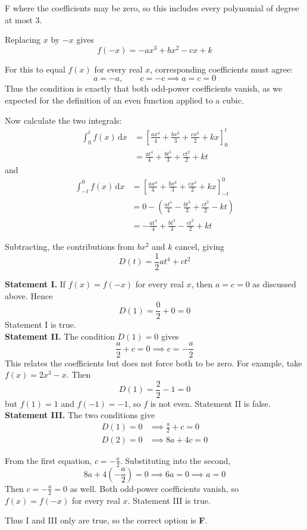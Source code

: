 \documentclass[11pt,a4paper]{article}
\begin{document}
\begin{enumerate}[label=\textbf{\arabic*.},leftmargin=*,itemsep=0pt,start=20]
\begin{djsSolution}{F}
where the coefficients may be zero, so this includes every polynomial of degree at most $3$.

Replacing $x$ by $-x$ gives
\[
f(-x)=-ax^3+bx^2-cx+k
\]

For this to equal $f(x)$ for every real $x$, corresponding coefficients must agree:
\[
a=-a,\qquad c=-c
\implies a=c=0
\]
Thus the condition is exactly that both odd-power coefficients vanish, as we expected for the definition of an even function applied to a cubic.

Now calculate the two integrals:
\[
\begin{aligned}
\int_0^t f(x)\,\mathrm{d}x
&=\left[\frac{ax^4}{4}+\frac{bx^3}{3}+\frac{cx^2}{2}+kx\right]_0^t\\[8pt]
&=\frac{at^4}{4}+\frac{bt^3}{3}+\frac{ct^2}{2}+kt
\end{aligned}
\]
and
\[
\begin{aligned}
\int_{-t}^0 f(x)\,\mathrm{d}x
&=\left[\frac{ax^4}{4}+\frac{bx^3}{3}+\frac{cx^2}{2}+kx\right]_{-t}^0\\[8pt]
&=0-\left(\frac{at^4}{4}-\frac{bt^3}{3}+\frac{ct^2}{2}-kt\right)\\[8pt]
&=-\frac{at^4}{4}+\frac{bt^3}{3}-\frac{ct^2}{2}+kt
\end{aligned}
\]

Subtracting, the contributions from $bx^2$ and $k$ cancel, giving
\[
\boxed{D(t)=\frac{1}{2}at^4+ct^2}
\]

\textbf{Statement I.} If $f(x)=f(-x)$ for every real $x$, then $a=c=0$ as discussed above. Hence
\[
D(1)=\frac02+0=0
\]
Statement I is true. \\

\textbf{Statement II.} The condition $D(1)=0$ gives
\[
\frac a2+c=0 \implies c=-\frac a2
\]
This relates the coefficients but does not force both to be zero. For example, take $f(x)=2x^3-x$. Then
\[
D(1)=\frac22-1=0
\]
but $f(1)=1$ and $f(-1)=-1$, so $f$ is not even. Statement II is false. \\

\textbf{Statement III.} The two conditions give
\[
\begin{aligned}
D(1)=0&\implies \frac a2+c=0\\[5pt]
D(2)=0&\implies 8a+4c=0
\end{aligned}
\]

From the first equation, $c=-\frac a2$. Substituting into the second,
\[
8a+4\left(-\frac a2\right)=0
\implies 6a=0
\implies a=0
\]
Then $c=-\frac a2=0$ as well. Both odd-power coefficients vanish, so $f(x)=f(-x)$ for every real $x$. Statement III is true.

Thus I and III only are true, so the correct option is \textbf{F}.
\end{djsSolution}
\end{enumerate}
\end{document}
